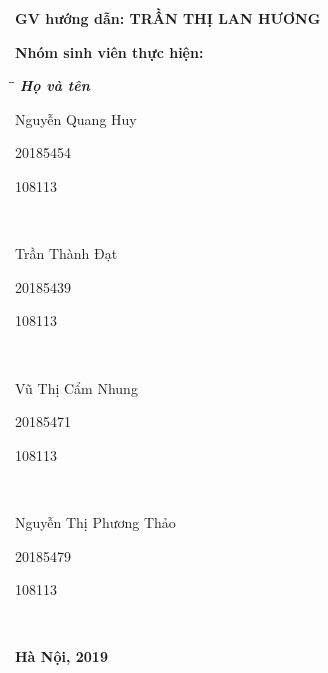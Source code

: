 \documentclass[a4paper]{article}
\begin{document}
\begin{titlepage}
\vspace{15pt}
\textbf{GV hướng dẫn: TRẦN THỊ LAN HƯƠNG}

\vspace{10pt}
\textbf{Nhóm sinh viên thực hiện:}

\begin{tabbing}
\hspace{8cm}\=\hspace{3cm}\=\hspace{3cm} \kill
{\it \textbf{Họ và tên}}\\
\begin{bfseries}Nguyễn Quang Huy\end{bfseries}\> \begin{bfseries}20185454\end{bfseries}\> \begin{bfseries}108113\end{bfseries}\\
\begin{bfseries}Trần Thành Đạt\end{bfseries}\> \begin{bfseries}20185439\end{bfseries}\> \begin{bfseries}108113\end{bfseries}\\
\begin{bfseries}Vũ Thị Cẩm Nhung\end{bfseries}\> \begin{bfseries}20185471\end{bfseries}\> \begin{bfseries}108113\end{bfseries}\\
\begin{bfseries}Nguyễn Thị Phương Thảo\end{bfseries}\> \begin{bfseries}20185479\end{bfseries}\> \begin{bfseries}108113\end{bfseries}\\

\end{tabbing}
\vspace{10pt}
\begin{center}
    \textbf{Hà Nội, 2019}
\end{center}
\end{titlepage}
\end{document}
